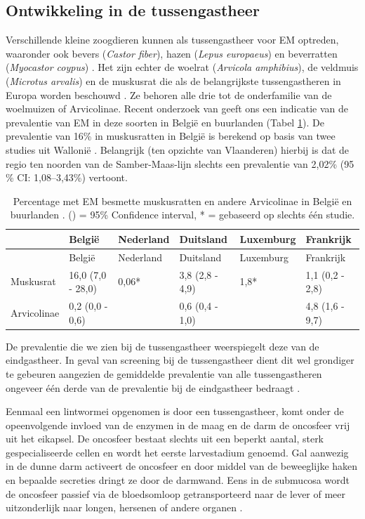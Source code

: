 \documentclass[twoside]{extreport}
\begin{document}
\subsection{Ontwikkeling in de
tussengastheer}\label{ontwikkeling-in-de-tussengastheer}

Verschillende kleine zoogdieren kunnen als tussengastheer voor EM
optreden, waaronder ook bevers (\emph{Castor fiber}), hazen (\emph{Lepus
europaeus}) en beverratten (\emph{Myocastor coypus})
\citep{romig2017ecology}. Het zijn echter de woelrat (\emph{Arvicola
amphibius}), de veldmuis (\emph{Microtus arvalis}) en de muskusrat die
als de belangrijkste tussengastheren in Europa worden beschouwd
\citep{eckert2001oie}. Ze behoren alle drie tot de onderfamilie van de
woelmuizen of Arvicolinae. Recent onderzoek van
\citet{oksanen2016geographical} geeft ons een indicatie van de
prevalentie van EM in deze soorten in België en buurlanden (Tabel
\ref{tab:prevtussengastheer}). De prevalentie van 16\% in muskusratten
in België is berekend op basis van twee studies uit Wallonië
\citep{mathy2009carriage, hanosset2008echinococcus}. Belangrijk (ten
opzichte van Vlaanderen) hierbij is dat de regio ten noorden van de
Samber-Maas-lijn slechts een prevalentie van 2,02\% (95 \% CI:
1,08--3,43\%) vertoont.

\begin{longtable}[]{@{}llllll@{}}
\caption{\label{tab:prevtussengastheer} Percentage met EM besmette
muskusratten en andere Arvicolinae in België en buurlanden
\citep{oksanen2016geographical}. () = 95\% Confidence interval, * =
gebaseerd op slechts één studie.}\tabularnewline
\toprule
& België & Nederland & Duitsland & Luxemburg & Frankrijk\tabularnewline
\midrule
\endfirsthead
\toprule
& België & Nederland & Duitsland & Luxemburg & Frankrijk\tabularnewline
\midrule
\endhead
Muskusrat & 16,0 (7,0 - 28,0) & 0,06* & 3,8 (2,8 - 4,9) & 1,8* & 1,1
(0,2 - 2,8)\tabularnewline
Arvicolinae & 0,2 (0,0 - 0,6) & & 0,6 (0,4 - 1,0) & & 4,8 (1,6 -
9,7)\tabularnewline
\bottomrule
\end{longtable}

De prevalentie die we zien bij de tussengastheer weerspiegelt deze van
de eindgastheer. In geval van screening bij de tussengastheer dient dit
wel grondiger te gebeuren aangezien de gemiddelde prevalentie van alle
tussengastheren ongeveer één derde van de prevalentie bij de
eindgastheer bedraagt \citep{oksanen2016geographical}.

Eenmaal een lintwormei opgenomen is door een tussengastheer, komt onder
de opeenvolgende invloed van de enzymen in de maag en de darm de
oncosfeer vrij uit het eikapsel. De oncosfeer bestaat slechts uit een
beperkt aantal, sterk gespecialiseerde cellen en wordt het eerste
larvestadium genoemd. Gal aanwezig in de dunne darm activeert de
oncosfeer en door middel van de beweeglijke haken en bepaalde secreties
dringt ze door de darmwand. Eens in de submucosa wordt de oncosfeer
passief via de bloedsomloop getransporteerd naar de lever of meer
uitzonderlijk naar longen, hersenen of andere organen
\citep{eckert2001oie}.
\end{document}
